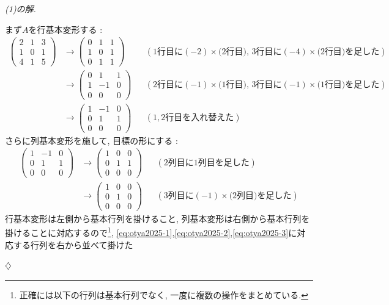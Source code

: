 \documentclass[titlepage]{jsarticle}
\numberwithin{equation}{section}
\newenvironment{kaitou}[1][解]{%
\begin{proofbox}%
\textit{#1. }\ignorespaces
}{%
\hfill$\diamondsuit$%
\end{proofbox}%
}
\begin{document}
\begin{kaitou}[(1)の解]
まず$A$を行基本変形する : 
\begin{align}
\begin{pmatrix}
2 & 1 & 3\\
1 & 0 & 1\\
4 & 1 & 5
\end{pmatrix}
&\to
\begin{pmatrix}
0 & 1 & 1\\
1 & 0 & 1\\
0 & 1 & 1
\end{pmatrix}
&&(\text{$1$行目に$(-2)\times$(2行目), $3$行目に$(-4)\times$($2$行目)を足した}) \label{eq:otya2025-1} \\
&\to
\begin{pmatrix}
0 & 1 & 1\\
1 & -1 & 0\\
0 & 0 & 0
\end{pmatrix}
&&(\text{$2$行目に$(-1)\times$($1$行目), $3$行目に$(-1)\times$($1$行目)を足した})　\label{eq:otya2025-2} \\
&\to
\begin{pmatrix}
1 & -1 & 0\\
0 & 1 & 1\\
0 & 0 & 0
\end{pmatrix}
&&(\text{$1, 2$行目を入れ替えた}) \label{eq:otya2025-3}
\end{align}
さらに列基本変形を施して, 目標の形にする :
\begin{align}
\begin{pmatrix}
1 & -1 & 0\\
0 & 1 & 1\\
0 & 0 & 0
\end{pmatrix}
&\to
\begin{pmatrix}
1 & 0 & 0\\
0 & 1 & 1\\
0 & 0& 0
\end{pmatrix}
&&(\text{$2$列目に$1$列目を足した}) \label{eq:otya2025-4}\\
&\to
\begin{pmatrix}
1 & 0 & 0\\
0 & 1 & 0\\
0 & 0& 0
\end{pmatrix}
&&(\text{$3$列目に$(-1)\times$($2$列目)を足した}) \label{eq:otya2025-5}
\end{align}
行基本変形は左側から基本行列を掛けること, 列基本変形は右側から基本行列を掛けることに対応するので\footnote{正確には以下の行列は基本行列でなく, 一度に複数の操作をまとめている.}, \eqref{eq:otya2025-1},\eqref{eq:otya2025-2},\eqref{eq:otya2025-3}に対応する行列を右から並べて掛けた

\end{kaitou}
\end{document}
